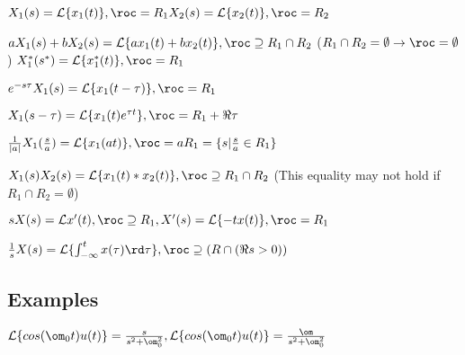 $X_1(s)=\mathcal L\{ x_1(t)\},\roc=R_1 \\ X_2(s)=\mathcal L\{ x_2(t)\},\roc=R_2$

$aX_1(s) + bX_2(s) = \mathcal L\{ax_1(t) + bx_2(t)\}, \roc\supseteq R_1\cap R_2$ ($R_1\cap R_2=\emptyset\to \roc=\emptyset$)
$X_1^*(s^*)=\mathcal L\{x_1^*(t)\}, \roc=R_1$

$e^{-s\tau}X_1(s)=\mathcal L\{x_1(t-\tau)\}, \roc=R_1$

$X_1(s-\tau)=\mathcal L\{x_1(t)e^{\tau t}\}, \roc=R_1+\Re{\tau}$

$\frac{1}{|a|}X_1(\frac s a)=\mathcal L\{x_1(at)\}, \roc=aR_1=\{s|\frac s a \in R_1\}$

$X_1(s)X_2(s)=\mathcal L\{x_1(t) * x_2(t) \}, \roc \supseteq R_1\cap R_2$ (This equality may not hold if $R_1\cap R_2=\emptyset$)

$sX(s)=\mathcal L{x'(t)}, \roc \supseteq R_1, X'(s)=\mathcal L\{-tx(t)\}, \roc = R_1$

$\frac 1 sX(s)=\mathcal L\{\int_{-\infty}^t x(\tau)\rd \tau\}, \roc \supseteq (R\cap (\Re s>0))$

\subsection*{Examples}

$\mathcal L\{cos(\om_0 t) u(t)\} = \frac{s}{s^2+\om_0^2}, \mathcal L\{cos(\om_0 t) u(t)\} = \frac{\om}{s^2+\om_0^2}$